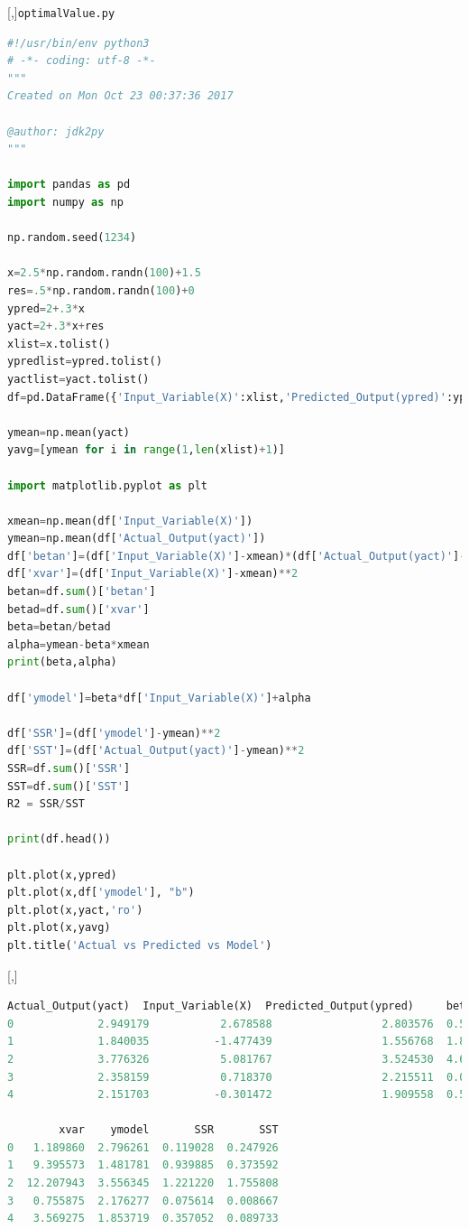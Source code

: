 [,]{\texttt{optimalValue.py}}
\begin{lstlisting}[language=Python]
#!/usr/bin/env python3
# -*- coding: utf-8 -*-
"""
Created on Mon Oct 23 00:37:36 2017

@author: jdk2py
"""

import pandas as pd
import numpy as np

np.random.seed(1234)

x=2.5*np.random.randn(100)+1.5
res=.5*np.random.randn(100)+0
ypred=2+.3*x
yact=2+.3*x+res
xlist=x.tolist()
ypredlist=ypred.tolist()
yactlist=yact.tolist()
df=pd.DataFrame({'Input_Variable(X)':xlist,'Predicted_Output(ypred)':ypredlist,'Actual_Output(yact)':yactlist})

ymean=np.mean(yact)
yavg=[ymean for i in range(1,len(xlist)+1)]

import matplotlib.pyplot as plt

xmean=np.mean(df['Input_Variable(X)'])
ymean=np.mean(df['Actual_Output(yact)'])
df['betan']=(df['Input_Variable(X)']-xmean)*(df['Actual_Output(yact)']-ymean)
df['xvar']=(df['Input_Variable(X)']-xmean)**2
betan=df.sum()['betan']
betad=df.sum()['xvar']
beta=betan/betad
alpha=ymean-beta*xmean
print(beta,alpha)

df['ymodel']=beta*df['Input_Variable(X)']+alpha

df['SSR']=(df['ymodel']-ymean)**2
df['SST']=(df['Actual_Output(yact)']-ymean)**2
SSR=df.sum()['SSR']
SST=df.sum()['SST']
R2 = SSR/SST

print(df.head())

plt.plot(x,ypred)
plt.plot(x,df['ymodel'], "b")
plt.plot(x,yact,'ro')
plt.plot(x,yavg)
plt.title('Actual vs Predicted vs Model')
\end{lstlisting}

[,]{}

\begin{lstlisting}[language=Python]
   Actual_Output(yact)  Input_Variable(X)  Predicted_Output(ypred)     betan  \
0             2.949179           2.678588                 2.803576  0.543137
1             1.840035          -1.477439                 1.556768  1.873530
2             3.776326           5.081767                 3.524530  4.629773
3             2.358159           0.718370                 2.215511  0.080941
4             2.151703          -0.301472                 1.909558  0.565934

        xvar    ymodel       SSR       SST
0   1.189860  2.796261  0.119028  0.247926
1   9.395573  1.481781  0.939885  0.373592
2  12.207943  3.556345  1.221220  1.755808
3   0.755875  2.176277  0.075614  0.008667
4   3.569275  1.853719  0.357052  0.089733
\end{lstlisting}


